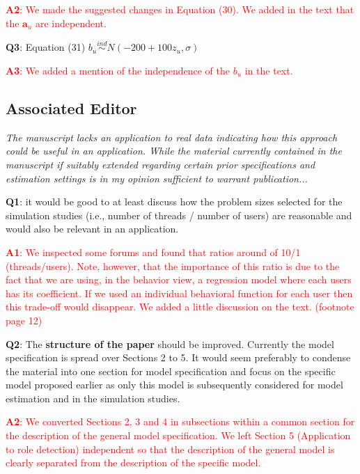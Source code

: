 \documentclass[]{article}
\newcommand\done[1]{\textcolor{red}{#1}}
\begin{document}
	\done{
		\textbf{A2}: We made the suggested changes in Equation (30).
		We added in the text that the $\mathbf{a}_u$ are independent.
	}
	
	\vspace{3mm}
	\textbf{Q3}: Equation (31) $b_u \overset{ind}{\sim} N(-200+100z_u , \sigma)$
	
	\done{
		\textbf{A3}: We added a mention of the independence of the $b_u$ in the text.
	}
	
	
	\subsection*{Associated Editor}
	\textit{	The manuscript lacks an application to real data indicating how this approach could be useful in an application. While the material currently contained in the manuscript if suitably extended regarding certain prior specifications and estimation settings is in my opinion sufficient to warrant publication...}
	
	\textbf{Q1}:
	it would be good to at least discuss how the problem sizes selected for the simulation studies (i.e., number of threads / number of users) are reasonable and would also be relevant in an application.
	
	\textcolor{red}{
		\textbf{A1}: We inspected some forums and found that ratios around of 10/1 (threads/users). Note, however, that the importance of this ratio is due to the fact that we are using, in the behavior view, a regression model where each users has its coefficient. If we used an individual behavioral function for each user then this trade-off would disappear. We added a little discussion on the text. (footnote page 12)
	}
	
	\vspace{3mm}
	\textbf{Q2}:
	The \textbf{structure of the paper} should be improved. Currently the model specification is spread over Sections 2 to 5. It would seem preferably to condense the material into one section for model specification and focus on the specific model proposed earlier as only this model is subsequently considered for model estimation and in the simulation studies.
	
	\done{
		\textbf{A2}: We converted Sections 2, 3 and 4 in subsections within a common section for the description of the general model specification. We left Section 5 (Application to role detection)	independent so that the description of the general model is clearly separated from the description of the specific model.  
	}
	
\end{document}
